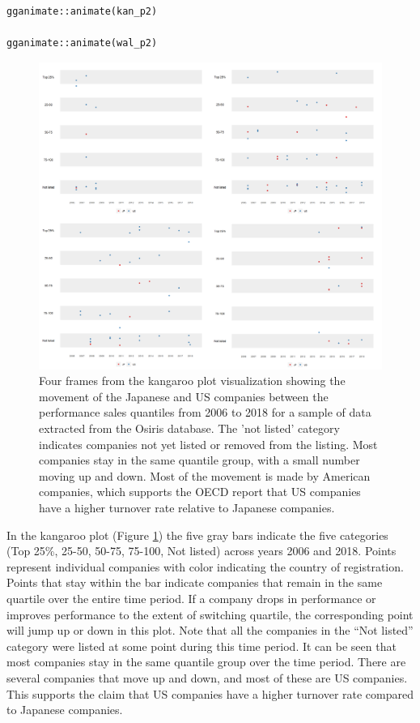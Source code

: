 \begin{verbatim}
gganimate::animate(kan_p2)

gganimate::animate(wal_p2)
\end{verbatim}

\begin{figure}

{\centering \includegraphics[width=1\linewidth]{figures/osiris} 

}

\caption{Four frames from the kangaroo plot visualization showing the movement of the Japanese and US companies between the performance sales quantiles from 2006 to 2018 for a sample of data extracted from the Osiris database. The 'not listed' category indicates companies not yet listed or removed from the listing. Most companies stay in the same quantile group, with a small number moving up and down. Most of the movement is made by American companies, which supports the OECD report that US companies have a higher turnover rate relative to Japanese companies.}\label{fig:kan-osiris-figure}
\end{figure}

In the kangaroo plot (Figure \ref{fig:kan-osiris-figure}) the five gray bars indicate the five categories (Top 25\%, 25-50, 50-75, 75-100, Not listed) across years 2006 and 2018. Points represent individual companies with color indicating the country of registration. Points that stay within the bar indicate companies that remain in the same quartile over the entire time period. If a company drops in performance or improves performance to the extent of switching quartile, the corresponding point will jump up or down in this plot. Note that all the companies in the ``Not listed'' category were listed at some point during this time period. It can be seen that most companies stay in the same quantile group over the time period. There are several companies that move up and down, and most of these are US companies. This supports the \citet{oecd_report} claim that US companies have a higher turnover rate compared to Japanese companies.

